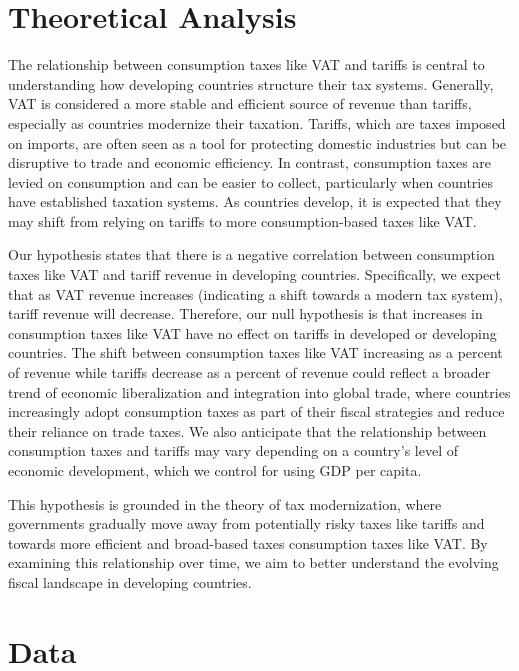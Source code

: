 \documentclass[12pt]{article}
\begin{document}
\section{Theoretical Analysis}
\label{sec:theory}
The relationship between consumption taxes like VAT and tariffs is central to understanding how developing countries structure their tax systems. Generally, VAT is considered a more stable and efficient source of revenue than tariffs, especially as countries modernize their taxation. Tariffs, which are taxes imposed on imports, are often seen as a tool for protecting domestic industries but can be disruptive to trade and economic efficiency. In contrast, consumption taxes are levied on consumption and can be easier to collect, particularly when countries have established taxation systems. As countries develop, it is expected that they may shift from relying on tariffs to more consumption-based taxes like VAT.

Our hypothesis states that there is a negative correlation between consumption taxes like VAT and tariff revenue in developing countries. Specifically, we expect that as VAT revenue increases (indicating a shift towards a modern tax system), tariff revenue will decrease. Therefore, our null hypothesis is that increases in consumption taxes like VAT have no effect on tariffs in developed or developing countries. 
The shift between consumption taxes like VAT increasing as a percent of revenue while tariffs decrease as a percent of revenue could reflect a broader trend of economic liberalization and integration into global trade, where countries increasingly adopt consumption taxes as part of their fiscal strategies and reduce their reliance on trade taxes. We also anticipate that the relationship between consumption taxes and tariffs may vary depending on a country's level of economic development, which we control for using GDP per capita.

This hypothesis is grounded in the theory of tax modernization, where governments gradually move away from potentially risky taxes like tariffs and towards more efficient and broad-based taxes consumption taxes like VAT. By examining this relationship over time, we aim to better understand the evolving fiscal landscape in developing countries.

\section{Data}
\label{sec:data}
\end{document}
